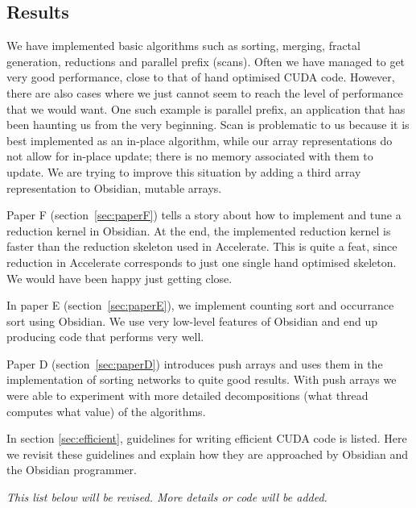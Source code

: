 \documentclass[a4paper]{book}
\begin{document}
\subsection{Results}
\FloatBarrier 

We have implemented basic algorithms such as sorting, merging, fractal generation, reductions 
and parallel prefix (scans). Often we have managed to get very good performance, close to that 
of hand optimised CUDA code. However, there are also cases where we just cannot seem to reach 
the level of performance that we would want. One such example is parallel prefix, an 
application that has been haunting us from the very beginning. Scan is problematic to us because 
it is best implemented as an in-place algorithm, while our array representations do 
not allow for in-place update; there is no memory associated with them to update. 
We are trying to improve this situation by adding a third array representation to Obsidian,
mutable arrays.   

Paper F (section~\ref{sec:paperF}) tells a story about how to implement and tune 
a reduction kernel in Obsidian. At the end, the implemented reduction kernel is  
faster than the reduction skeleton used in Accelerate. This is quite a feat, since 
reduction in Accelerate corresponds to just one single hand optimised skeleton. We would have 
been happy just getting close.   

In paper E (section~\ref{sec:paperE}), we implement counting sort and occurrance sort 
using Obsidian. We use very low-level features of Obsidian and end up producing 
code that performs very well. 

Paper D (section~\ref{sec:paperD}) introduces push arrays and uses them in the 
implementation of sorting networks to quite good results. With push arrays we 
were able to experiment with more detailed decompositions (what thread computes 
what value) of the algorithms. 

In section \ref{sec:efficient}, guidelines for writing efficient CUDA code is listed. 
Here we revisit these guidelines and explain how they are approached by Obsidian and 
the Obsidian programmer. 

\vspace{5mm}

\emph{This list below will be revised. More details or code will be added.}

\vspace{5mm}
\end{document}
